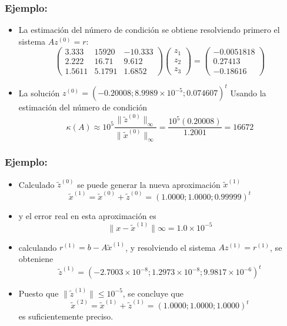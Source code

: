 \documentclass[10pt]{beamer}
\begin{document}
  \begin{frame}
    \frametitle{Ejemplo:}
    \begin{itemize}
      \item<1-> La estimaci\'on del n\'umero de condici\'on se obtiene resolviendo primero el sistema $A z^{(0)} = r$:      
      $$
      \left(\begin{array}{ccc}
             3.333 & 15920 & -10.333\\
             2.222 & 16.71 & 9.612\\
             1.5611 & 5.1791 & 1.6852
            \end{array}\right)\left(\begin{array}{c}
            z_1\\
            z_2\\
            z_3
            \end{array}\right)=\left(\begin{array}{c}
          -0.0051818\\
          0.27413\\
          -0.18616
            \end{array}\right)
      $$
      \item <2-> La soluci\'on $z^{(0)} = (-0.20008; 8.9989 \times 10^{-5}; 0.074607)^t$ Usando la estimaci\'on del n\'umero de condici\'on      
       $$
       \kappa(A) \approx 10^5\frac{\|\tilde z^{(0)}\|_{\infty}}{\|\tilde x^{(0)}\|_{\infty}} = \frac{10^5(0.20008)}{1.2001} = 16672
       $$
      \end{itemize}
    \end{frame}  
  \begin{frame}
    \frametitle{Ejemplo:}
    \begin{itemize}
      \item Calculado $\tilde z^{(0)}$ se puede generar la nueva aproximaci\'on $\tilde x^{(1)}$
      $$
      \tilde x^{(1)} = \tilde x^{(0)} + \tilde z^{(0)} = (1.0000; 1.0000; 0.99999)^t
      $$
      \item<2-> y el error real en esta aproximaci\'on es
      $$
      \|x - \tilde x^{(1)}\|\infty = 1.0 \times 10^{-5}
      $$
      \item<3-> calculando $r^{(1)} = b - A \tilde x^{(1)}$, y resolviendo el sistema $A z^{(1)} = r^{(1)}$, se obteniene
      $$
      \tilde z^{(1)} = (-2.7003 \times 10^{-8}; 1.2973 \times 10^{-8}; 9.9817 \times 10^{-6})^t
      $$
      \item<4-> Puesto que $\|\tilde z^{(1)}\| \leq 10^{-5}$, se concluye que
      $$
      \tilde x^{(2)}= \tilde x^{(1)} + \tilde z^{(1)} = (1.0000; 1.0000; 1.0000)^t
      $$      
      es suficientemente preciso.
    \end{itemize}
  \end{frame}
\end{document}

